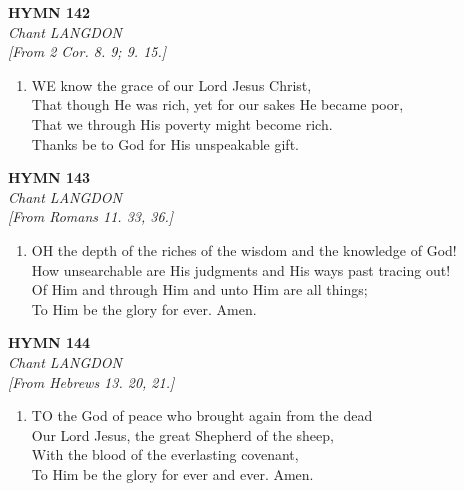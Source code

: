 \documentclass[11pt,a4paper]{article}
\begin{document}
\newpage
\begin{center}
    {\Large \textbf{HYMN 142}}
    \\
    \textit{Chant LANGDON}
    \\
    \textit{\small [From 2 Cor. 8. 9; 9. 15.]}
\end{center}
\vspace{1em}

\begin{enumerate}
    \item WE know the grace of our Lord Jesus Christ, \\
        That though He was rich, yet for our sakes He became poor, \\
        That we through His poverty might become rich. \\
        Thanks be to God for His unspeakable gift.

\end{enumerate}

\newpage
\begin{center}
    {\Large \textbf{HYMN 143}}
    \\
    \textit{Chant LANGDON}
    \\
    \textit{\small [From Romans 11. 33, 36.]}
\end{center}
\vspace{1em}

\begin{enumerate}
    \item OH the depth of the riches of the wisdom and the knowledge of God! \\
        How unsearchable are His judgments and His ways past tracing out! \\
        Of Him and through Him and unto Him are all things; \\
        To Him be the glory for ever. Amen.

\end{enumerate}

\newpage
\begin{center}
    {\Large \textbf{HYMN 144}}
    \\
    \textit{Chant LANGDON}
    \\
    \textit{\small [From Hebrews 13. 20, 21.]}
\end{center}
\vspace{1em}

\begin{enumerate}
    \item TO the God of peace who brought again from the dead \\
        Our Lord Jesus, the great Shepherd of the sheep, \\
        With the blood of the everlasting covenant, \\
        To Him be the glory for ever and ever. Amen.

\end{enumerate}
\end{document}
